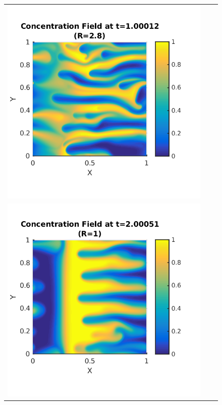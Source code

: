 \documentclass{article}
\begin{document}
\begin{enumerate}
\begin{figure}[!ht]
\begin{tabular}{c c c}
\includegraphics[scale=0.5]{conc28_100.png} \\
\includegraphics[scale=0.5]{conc10_200.png} &

\end{tabular}
\end{figure}
\end{enumerate}
\end{document}
